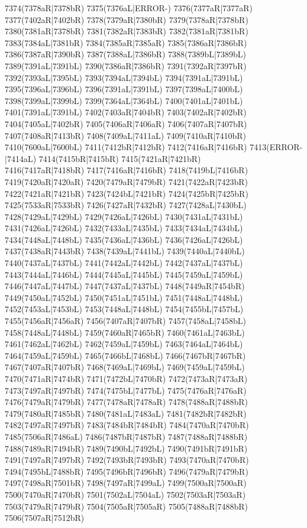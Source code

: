 7374(7378aR|7378bR) 7375(7376aL|ERROR-) 7376(7377aR|7377aR) 7377(7402aR|7402bR) 7378(7379aR|7380bR) 7379(7378aR|7378bR) \\7380(7381aR|7378bR) 7381(7382aR|7383bR) 7382(7381aR|7381bR) 7383(7384aL|7381bR) 7384(7385aR|7385aR) 7385(7386aR|7386bR) 7386(7387aR|7390bR) 7387(7388aL|7386bR) 7388(7389bL|7389bL) \\7389(7391aL|7391bL) 7390(7386aR|7386bR) 7391(7392aR|7397bR) 7392(7393aL|7395bL) 7393(7394aL|7394bL) 7394(7391aL|7391bL) 7395(7396aL|7396bL) 7396(7391aL|7391bL) 7397(7398aL|7400bL) \\7398(7399aL|7399bL) 7399(7364aL|7364bL) 7400(7401aL|7401bL) 7401(7391aL|7391bL) 7402(7403aR|7404bR) 7403(7402aR|7402bR) 7404(7405aL|7402bR) 7405(7406aR|7406aR) 7406(7407aR|7407bR) \\7407(7408aR|7413bR) 7408(7409aL|7411aL) 7409(7410aR|7410bR) 7410(7600aL|7600bL) 7411(7412bR|7412bR) 7412(7416aR|7416bR) 7413(ERROR-|7414aL) 7414(7415bR|7415bR) 7415(7421aR|7421bR) \\7416(7417aR|7418bR) 7417(7416aR|7416bR) 7418(7419bL|7416bR) 7419(7420aR|7420aR) 7420(7479aR|7479bR) 7421(7422aR|7423bR) 7422(7421aR|7421bR) 7423(7424bL|7421bR) 7424(7425bR|7425bR) \\7425(7533aR|7533bR) 7426(7427aR|7432bR) 7427(7428aL|7430bL) 7428(7429aL|7429bL) 7429(7426aL|7426bL) 7430(7431aL|7431bL) 7431(7426aL|7426bL) 7432(7433aL|7435bL) 7433(7434aL|7434bL) \\7434(7448aL|7448bL) 7435(7436aL|7436bL) 7436(7426aL|7426bL) 7437(7438aR|7443bR) 7438(7439aL|7441bL) 7439(7440aL|7440bL) 7440(7437aL|7437bL) 7441(7442aL|7442bL) 7442(7437aL|7437bL) \\7443(7444aL|7446bL) 7444(7445aL|7445bL) 7445(7459aL|7459bL) 7446(7447aL|7447bL) 7447(7437aL|7437bL) 7448(7449aR|7454bR) 7449(7450aL|7452bL) 7450(7451aL|7451bL) 7451(7448aL|7448bL) \\7452(7453aL|7453bL) 7453(7448aL|7448bL) 7454(7455bL|7457bL) 7455(7456aR|7456aR) 7456(7407aR|7407bR) 7457(7458aL|7458bL) 7458(7448aL|7448bL) 7459(7460aR|7465bR) 7460(7461aL|7463bL) \\7461(7462aL|7462bL) 7462(7459aL|7459bL) 7463(7464aL|7464bL) 7464(7459aL|7459bL) 7465(7466bL|7468bL) 7466(7467bR|7467bR) 7467(7407aR|7407bR) 7468(7469aL|7469bL) 7469(7459aL|7459bL) \\7470(7471aR|7474bR) 7471(7472bL|7470bR) 7472(7473aR|7473aR) 7473(7497aR|7497bR) 7474(7475bL|7477bL) 7475(7476aR|7476aR) 7476(7479aR|7479bR) 7477(7478aR|7478aR) 7478(7488aR|7488bR) \\7479(7480aR|7485bR) 7480(7481aL|7483aL) 7481(7482bR|7482bR) 7482(7497aR|7497bR) 7483(7484bR|7484bR) 7484(7470aR|7470bR) 7485(7506aR|7486aL) 7486(7487bR|7487bR) 7487(7488aR|7488bR) \\7488(7489aR|7494bR) 7489(7490bL|7492bL) 7490(7491bR|7491bR) 7491(7497aR|7497bR) 7492(7493bR|7493bR) 7493(7470aR|7470bR) 7494(7495bL|7488bR) 7495(7496bR|7496bR) 7496(7479aR|7479bR) \\7497(7498aR|7501bR) 7498(7497aR|7499aL) 7499(7500aR|7500aR) 7500(7470aR|7470bR) 7501(7502aL|7504aL) 7502(7503aR|7503aR) 7503(7479aR|7479bR) 7504(7505aR|7505aR) 7505(7488aR|7488bR) \\7506(7507aR|7512bR) 